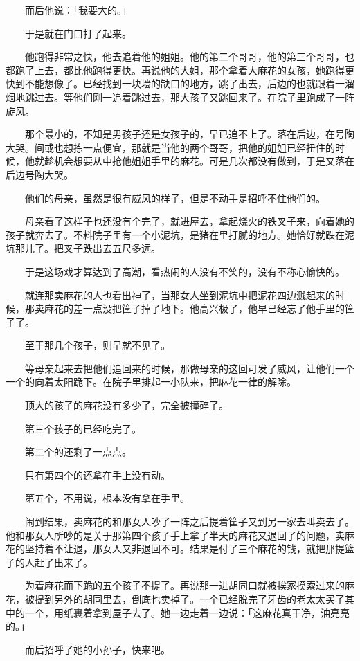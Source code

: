 \documentclass[UTF8]{ctexart}
\begin{document}
　　而后他说：「我要大的。」

　　于是就在门口打了起来。

　　他跑得非常之快，他去追着他的姐姐。他的第二个哥哥，他的第三个哥哥，也都跑了上去，都比他跑得更快。再说他的大姐，那个拿着大麻花的女孩，她跑得更快到不能想像了。已经找到一块墙的缺口的地方，跳了出去，后边的也就跟着一溜烟地跳过去。等他们刚一追着跳过去，那大孩子又跳回来了。在院子里跑成了一阵旋风。

　　那个最小的，不知是男孩子还是女孩子的，早已追不上了。落在后边，在号陶大哭。间或也想拣一点便宜，那就是当他的两个哥哥，把他的姐姐已经扭住的时候，他就趁机会想要从中抢他姐姐手里的麻花。可是几次都没有做到，于是又落在后边号陶大哭。

　　他们的母亲，虽然是很有威风的样子，但是不动手是招呼不住他们的。

　　母亲看了这样子也还没有个完了，就进屋去，拿起烧火的铁叉子来，向着她的孩子就奔去了。不料院子里有一个小泥坑，是猪在里打腻的地方。她恰好就跌在泥坑那儿了。把叉子跌出去五尺多远。

　　于是这场戏才算达到了高潮，看热闹的人没有不笑的，没有不称心愉快的。

　　就连那卖麻花的人也看出神了，当那女人坐到泥坑中把泥花四边溅起来的时候，那卖麻花的差一点没把筐子掉了地下。他高兴极了，他早已经忘了他手里的筐子了。

　　至于那几个孩子，则早就不见了。

　　等母亲起来去把他们追回来的时候，那做母亲的这回可发了威风，让他们一个一个的向着太阳跪下。在院子里排起一小队来，把麻花一律的解除。

　　顶大的孩子的麻花没有多少了，完全被撞碎了。

　　第三个孩子的已经吃完了。

　　第二个的还剩了一点点。

　　只有第四个的还拿在手上没有动。

　　第五个，不用说，根本没有拿在手里。

　　闹到结果，卖麻花的和那女人吵了一阵之后提着筐子又到另一家去叫卖去了。他和那女人所吵的是关于那第四个孩子手上拿了半天的麻花又退回了的问题，卖麻花的坚持着不让退，那女人又非退回不可。结果是付了三个麻花的钱，就把那提篮子的人赶了出来了。

　　为着麻花而下跪的五个孩子不提了。再说那一进胡同口就被挨家摸索过来的麻花，被提到另外的胡同里去，倒底也卖掉了。一个已经脱完了牙齿的老太太买了其中的一个，用纸裹着拿到屋子去了。她一边走着一边说：「这麻花真干净，油亮亮的。」

　　而后招呼了她的小孙子，快来吧。
\end{document}

